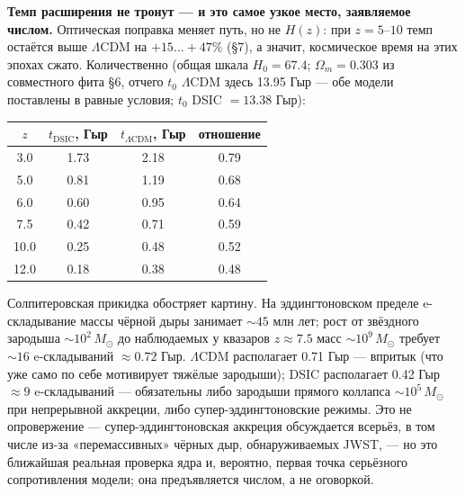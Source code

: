 \documentclass{article}
\begin{document}
\medskip
\noindent\textbf{Темп расширения не тронут --- и это самое узкое место, заявляемое числом.} Оптическая поправка меняет путь, но не $H(z)$: при $z = 5\text{--}10$ темп остаётся выше $\Lambda$CDM на $+15\ldots+47\%$ (\S7), а значит, космическое время на этих эпохах сжато. Количественно (общая шкала $H_0 = 67.4$; $\Omega_m = 0.303$ из совместного фита \S6, отчего $t_0$ $\Lambda$CDM здесь 13.95 Гыр --- обе модели поставлены в равные условия; $t_0$ DSIC $= 13.38$ Гыр):

\begin{table}[htbp]
\centering
\small
\begin{tabular}{@{}cccc@{}}
\toprule
$z$ & $t_{\text{DSIC}}$, Гыр & $t_{\Lambda\text{CDM}}$, Гыр & отношение \\
\midrule
3.0 & 1.73 & 2.18 & 0.79 \\
5.0 & 0.81 & 1.19 & 0.68 \\
6.0 & 0.60 & 0.95 & 0.64 \\
7.5 & 0.42 & 0.71 & 0.59 \\
10.0 & 0.25 & 0.48 & 0.52 \\
12.0 & 0.18 & 0.38 & 0.48 \\
\bottomrule
\end{tabular}
\end{table}

Солпитеровская прикидка обостряет картину. На эддингтоновском пределе e-складывание массы чёрной дыры занимает ${\sim}45$ млн лет; рост от звёздного зародыша ${\sim}10^2\,M_\odot$ до наблюдаемых у квазаров $z \approx 7.5$ масс ${\sim}10^9\,M_\odot$ требует ${\sim}16$ e-складываний $\approx 0.72$ Гыр. $\Lambda$CDM располагает 0.71 Гыр --- впритык (что уже само по себе мотивирует тяжёлые зародыши); DSIC располагает 0.42 Гыр $\approx 9$ e-складываний --- обязательны либо зародыши прямого коллапса ${\sim}10^5\,M_\odot$ при непрерывной аккреции, либо супер-эддингтоновские режимы. Это не опровержение --- супер-эддингтоновская аккреция обсуждается всерьёз, в том числе из-за «перемассивных» чёрных дыр, обнаруживаемых JWST, --- но это ближайшая реальная проверка ядра и, вероятно, первая точка серьёзного сопротивления модели; она предъявляется числом, а не оговоркой.
\end{document}
